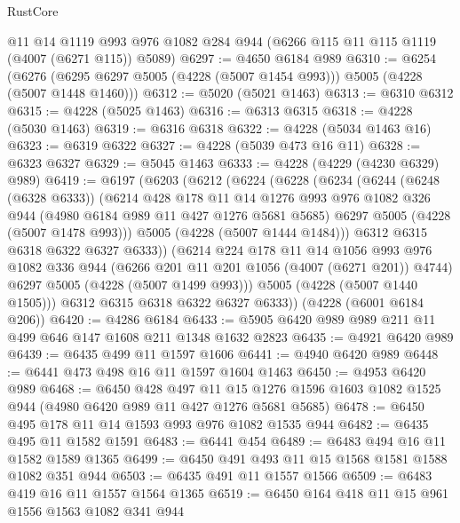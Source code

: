 \begin{lexlean}{RustCore}
\begin{coremodule}
    @11
    @14
    @1119
    @993
    @976
    @1082
    @284
    @944
    (@6266 @115 @11 @115 @1119 (@4007 (@6271 @115)) @5089)
@6297 := @4650 @6184 @989
@6310 := @6254
    (@6276 (@6295 @6297 @5005 (@4228 (@5007 @1454 @993))) @5005 (@4228 (@5007 @1448 @1460)))
@6312 := @5020 (@5021 @1463)
@6313 := @6310 @6312
@6315 := @4228 (@5025 @1463)
@6316 := @6313 @6315
@6318 := @4228 (@5030 @1463)
@6319 := @6316 @6318
@6322 := @4228 (@5034 @1463 @16)
@6323 := @6319 @6322
@6327 := @4228 (@5039 @473 @16 @11)
@6328 := @6323 @6327
@6329 := @5045 @1463
@6333 := @4228 (@4229 (@4230 @6329) @989)
@6419 := @6197
    (@6203
      (@6212
        (@6224
          (@6228
            (@6234
              (@6244
                (@6248 (@6328 @6333))
                (@6214
                  @428
                  @178
                  @11
                  @14
                  @1276
                  @993
                  @976
                  @1082
                  @326
                  @944
                  (@4980 @6184 @989 @11 @427 @1276 @5681 @5685)
                  @6297
                  @5005
                  (@4228 (@5007 @1478 @993)))
                @5005
                (@4228 (@5007 @1444 @1484)))
              @6312
              @6315
              @6318
              @6322
              @6327
              @6333))
          (@6214
            @224
            @178
            @11
            @14
            @1056
            @993
            @976
            @1082
            @336
            @944
            (@6266 @201 @11 @201 @1056 (@4007 (@6271 @201)) @4744)
            @6297
            @5005
            (@4228 (@5007 @1499 @993)))
          @5005
          (@4228 (@5007 @1440 @1505)))
        @6312
        @6315
        @6318
        @6322
        @6327
        @6333))
    (@4228 (@6001 @6184 @206))
@6420 := @4286 @6184
@6433 := @5905 @6420 @989 @989 @211 @11 @499 @646 @147 @1608 @211 @1348 @1632 @2823
@6435 := @4921 @6420 @989
@6439 := @6435 @499 @11 @1597 @1606
@6441 := @4940 @6420 @989
@6448 := @6441 @473 @498 @16 @11 @1597 @1604 @1463
@6450 := @4953 @6420 @989
@6468 := @6450
    @428
    @497
    @11
    @15
    @1276
    @1596
    @1603
    @1082
    @1525
    @944
    (@4980 @6420 @989 @11 @427 @1276 @5681 @5685)
@6478 := @6450 @495 @178 @11 @14 @1593 @993 @976 @1082 @1535 @944
@6482 := @6435 @495 @11 @1582 @1591
@6483 := @6441 @454
@6489 := @6483 @494 @16 @11 @1582 @1589 @1365
@6499 := @6450 @491 @493 @11 @15 @1568 @1581 @1588 @1082 @351 @944
@6503 := @6435 @491 @11 @1557 @1566
@6509 := @6483 @419 @16 @11 @1557 @1564 @1365
@6519 := @6450 @164 @418 @11 @15 @961 @1556 @1563 @1082 @341 @944

\end{coremodule}
\end{lexlean}
